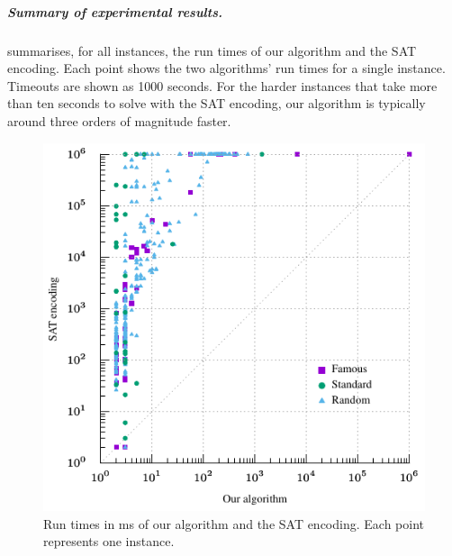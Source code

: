 {    %

    \subparagraph*{Summary of experimental results.}
     summarises, for all instances, the run times of our algorithm
    and the SAT encoding.  Each point shows the two algorithms' run times
    for a single instance.  Timeouts are shown as 1000 seconds.  For the harder instances that take more
    than ten seconds to solve with the SAT encoding, our algorithm is typically around three orders
    of magnitude faster.

    \begin{figure}[htb]
      \centering
      \includegraphics[scale=1.4]{60-treedepth/scatter}
      \caption{Run times in ms of our algorithm and the SAT encoding. Each point represents one instance.}
      \label{fig:runtimesscatter}
    \end{figure}

}
